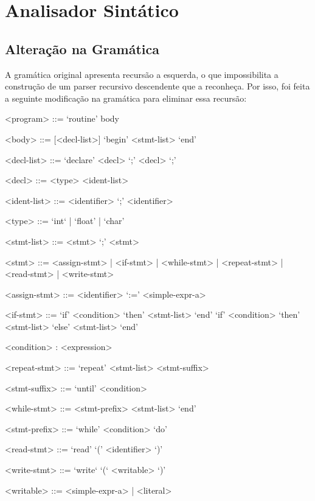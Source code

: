 \chapter{Analisador Sintático}
\label{cap:sintatico}

\section{Alteração na Gramática}
A gramática original apresenta recursão a esquerda, o que impossibilita a construção de um parser recursivo descendente que a reconheça.
Por isso, foi feita a seguinte modificação na gramática para eliminar essa recursão:

\begin{grammar}
    
    <program> ::= `routine' body
    
    <body> ::= [<decl-list>] `begin' <stmt-list> `end'
    
    <decl-list> ::= `declare' <decl> `;' {<decl> `;'}
    
    <decl> ::= <type> <ident-list>
    
    <ident-list> ::= <identifier> {`;' <identifier>}
    
    <type> ::= `int` | `float' | `char'
    
    <stmt-list> ::= <stmt> {`;' <stmt>}
    
    <stmt> ::= <assign-stmt> | <if-stmt> | <while-stmt> | <repeat-stmt> | <read-stmt> | <write-stmt>
    
    <assign-stmt> ::= <identifier> `:=' <simple-expr-a>
    
    <if-stmt> ::= `if' <condition> `then' <stmt-list> `end'
                  \alt `if' <condition> `then' <stmt-list> `else' <stmt-list> `end'
                  
    <condition> : <expression>
    
    <repeat-stmt> ::= `repeat' <stmt-list> <stmt-suffix>
    
    <stmt-suffix> ::= `until' <condition>
    
    <while-stmt> ::= <stmt-prefix> <stmt-list> `end'
    
    <stmt-prefix> ::= `while' <condition> `do'
    
    <read-stmt> ::= `read' `(' <identifier> `)'
    
    <write-stmt> ::= `write` `(` <writable> `)'
    
    <writable> ::= <simple-expr-a> | <literal>
    

\end{grammar}

